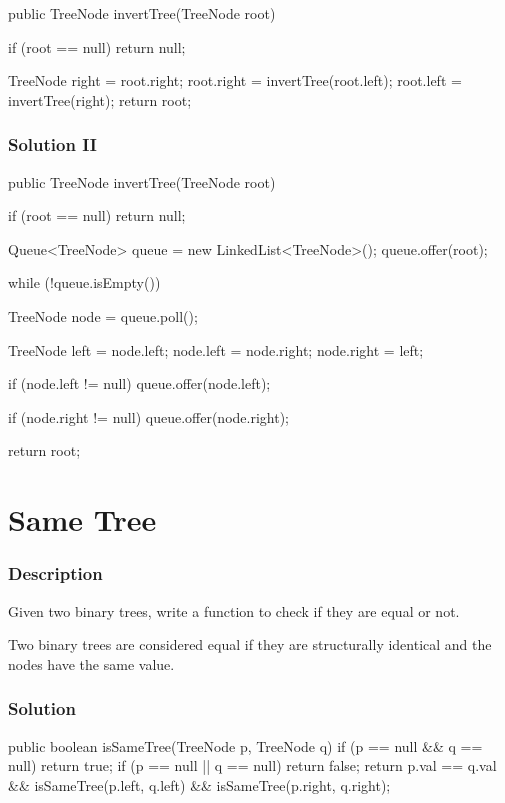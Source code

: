 \begin{Code}
public TreeNode invertTree(TreeNode root) {
    if (root == null) {
        return null;
    }

    TreeNode right = root.right;
    root.right = invertTree(root.left);
    root.left = invertTree(right);
    return root;
}
\end{Code}

\subsubsection{Solution II}

\begin{Code}
public TreeNode invertTree(TreeNode root) {
    if (root == null) {
        return null;
    }

    Queue<TreeNode> queue = new LinkedList<TreeNode>();
    queue.offer(root);

    while (!queue.isEmpty()) {
        TreeNode node = queue.poll();

        TreeNode left = node.left;
        node.left = node.right;
        node.right = left;

        if (node.left != null) {
            queue.offer(node.left);
        }

        if (node.right != null) {
            queue.offer(node.right);
        }
    }

    return root;
}
\end{Code}

\newpage

\section{Same Tree} %

\subsubsection{Description}

Given two binary trees, write a function to check if they are equal or not.

Two binary trees are considered equal if they are structurally identical and the nodes have the same value.

\subsubsection{Solution}

\begin{Code}
public boolean isSameTree(TreeNode p, TreeNode q) {
    if (p == null && q == null) {
        return true;
    }
    if (p == null || q == null) {
        return false;
    }
    return p.val == q.val && isSameTree(p.left, q.left) && isSameTree(p.right, q.right);
}
\end{Code}

